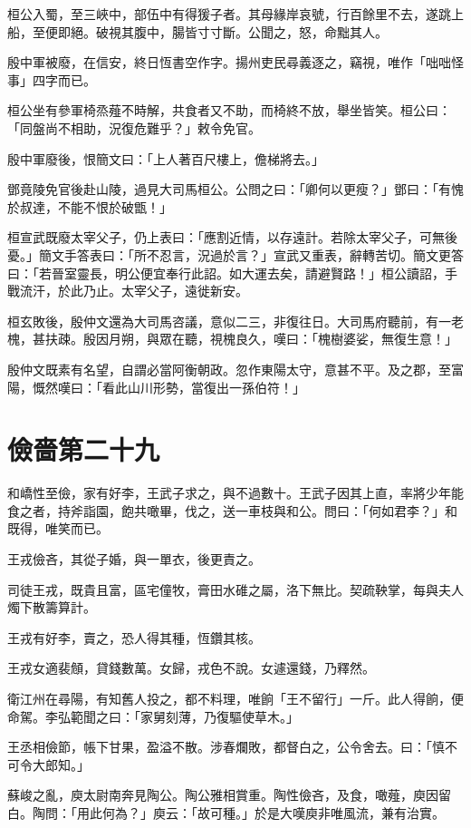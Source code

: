 桓公入蜀，至三峽中，部伍中有得猨子者。其母緣岸哀號，行百餘里不去，遂跳上船，至便即絕。破視其腹中，腸皆寸寸斷。公聞之，怒，命黜其人。

殷中軍被廢，在信安，終日恆書空作字。揚州吏民尋義逐之，竊視，唯作「咄咄怪事」四字而已。

桓公坐有參軍椅烝薤不時解，共食者又不助，而椅終不放，舉坐皆笑。桓公曰：「同盤尚不相助，況復危難乎？」敕令免官。

殷中軍廢後，恨簡文曰：「上人著百尺樓上，儋梯將去。」

鄧竟陵免官後赴山陵，過見大司馬桓公。公問之曰：「卿何以更瘦？」鄧曰：「有愧於叔達，不能不恨於破甑！」

桓宣武既廢太宰父子，仍上表曰：「應割近情，以存遠計。若除太宰父子，可無後憂。」簡文手答表曰：「所不忍言，況過於言？」宣武又重表，辭轉苦切。簡文更答曰：「若晉室靈長，明公便宜奉行此詔。如大運去矣，請避賢路！」桓公讀詔，手戰流汗，於此乃止。太宰父子，遠徙新安。

桓玄敗後，殷仲文還為大司馬咨議，意似二三，非復往日。大司馬府聽前，有一老槐，甚扶疎。殷因月朔，與眾在聽，視槐良久，嘆曰：「槐樹婆娑，無復生意！」

殷仲文既素有名望，自謂必當阿衡朝政。忽作東陽太守，意甚不平。及之郡，至富陽，慨然嘆曰：「看此山川形勢，當復出一孫伯符！」



\chapter{儉嗇第二十九}

和嶠性至儉，家有好李，王武子求之，與不過數十。王武子因其上直，率將少年能食之者，持斧詣園，飽共噉畢，伐之，送一車枝與和公。問曰：「何如君李？」和既得，唯笑而已。

王戎儉吝，其從子婚，與一單衣，後更責之。

司徒王戎，既貴且富，區宅僮牧，膏田水碓之屬，洛下無比。契疏鞅掌，每與夫人燭下散籌算計。

王戎有好李，賣之，恐人得其種，恆鑽其核。

王戎女適裴頠，貸錢數萬。女歸，戎色不說。女遽還錢，乃釋然。

衛江州在尋陽，有知舊人投之，都不料理，唯餉「王不留行」一斤。此人得餉，便命駕。李弘範聞之曰：「家舅刻薄，乃復驅使草木。」

王丞相儉節，帳下甘果，盈溢不散。涉春爛敗，都督白之，公令舍去。曰：「慎不可令大郎知。」

蘇峻之亂，庾太尉南奔見陶公。陶公雅相賞重。陶性儉吝，及食，噉薤，庾因留白。陶問：「用此何為？」庾云：「故可種。」於是大嘆庾非唯風流，兼有治實。

